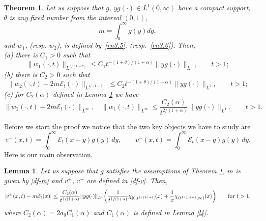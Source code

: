 \documentclass{article}
\newtheorem{theorem}{Theorem}
\newtheorem{lemma}{Lemma}
\def\sE{{\mathscr{E}}}
\begin{document}
\begin{theorem}\label{t1}
Let us suppose that  $g,\ yg(\cdot) \in L^1(0,\infty)$ have a compact support, $\theta$ is any fixed number from the interval $(0,1)$, 
\begin{equation}\label{df-m}
m=\int_0^\infty g(y)dy,
\end{equation} 
and $w_1$, (resp. $w_2$), is defined by~\eqref{rn3.5}, (resp.~\eqref{rn3.6}).
Then, \\
(a) there is $C_1>0$ such that 
$$
\|w_1(\cdot,t) \|_{L^{1/(1-\theta)}} \le C_1  t^{- (1+\theta)/(1+\alpha)} \|y g(\cdot)\|_{L^1}, \qquad t>1;
$$
(b) there is $C_2>0$ such that 
$$
\|w_2(\cdot,t)-2m\sE_t(\cdot)\|_{L^{1/(1-\theta)}} \le C_2 
 t^{- (1+\theta)/(1+\alpha)} \|y g(\cdot)\|_{L^1},\qquad t>1;
$$
(c) for $C_2(\alpha)$ defined in Lemma \ref{l5} we have
$$
\|w_2(\cdot,t)-2m\sE_t(\cdot)\|_{L^\infty}, \quad 
\|w_1(\cdot,t) \|_{L^\infty} \le \frac{C_2(\alpha)}{t^{2/(1+\alpha)}} \|y g(\cdot)\|_{L^1}, \qquad t>1.
$$
\end{theorem}
Before we start the proof we notice  that the two key objects we have to study are
\begin{equation}\label{df-v}
v^+(x,t) = \int_0^\infty    \sE_t(x+y)g(y)\,dy,\qquad
v^-(x,t) = \int_0^\infty \sE_t(x-y) g(y)\,dy.
\end{equation}
Here is our main observation.
\begin{lemma}\label{l5}
Let us suppose that $g$ satisfies the assumptions of Theorem \ref{t1}, $m$ is given by \eqref{df-m} and $v^+$, $v^-$ are defined in \eqref{df-v}. Then, 
$$
|v^\pm (x, t)  - m \sE_t(x)| \le \frac{C_2(\alpha)}{t^{1/(1+\alpha)}}\| y g(\cdot)\|_{L^1}\bigg(\frac1{t^{1/(1+\alpha)}}\chi_{[0, t^{1/(1+\alpha)}]}(x) + \frac 1x \chi_{(t^{1/(1+\alpha)}, \infty)}(x)\bigg)\qquad\hbox{for }t>1,
$$
where $C_2(\alpha) =2a_0 C_1(\alpha)$ and $C_1(\alpha)$ is defined in Lemma \ref{l4}.
\end{lemma}
\end{document}
